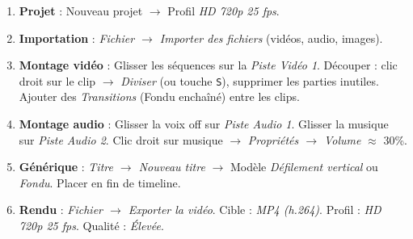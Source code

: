 \documentclass[11pt]{article}
\begin{document}
\begin{methode}
\begin{enumerate}
  \item \textbf{Projet} : Nouveau projet $\rightarrow$ Profil \emph{HD 720p 25 fps}.
  \item \textbf{Importation} : \emph{Fichier $\rightarrow$ Importer des fichiers} (vidéos, audio, images).
  \item \textbf{Montage vidéo} : Glisser les séquences sur la \emph{Piste Vidéo 1}. Découper : clic droit sur le clip $\rightarrow$ \emph{Diviser} (ou touche \texttt{S}), supprimer les parties inutiles. Ajouter des \emph{Transitions} (Fondu enchaîné) entre les clips.
  \item \textbf{Montage audio} : Glisser la voix off sur \emph{Piste Audio 1}. Glisser la musique sur \emph{Piste Audio 2}. Clic droit sur musique $\rightarrow$ \emph{Propriétés $\rightarrow$ Volume} $\approx$ 30\%.
  \item \textbf{Générique} : \emph{Titre $\rightarrow$ Nouveau titre} $\rightarrow$ Modèle \emph{Défilement vertical} ou \emph{Fondu}. Placer en fin de timeline.
  \item \textbf{Rendu} : \emph{Fichier $\rightarrow$ Exporter la vidéo}. Cible : \emph{MP4 (h.264)}. Profil : \emph{HD 720p 25 fps}. Qualité : \emph{Élevée}.
\end{enumerate}
\end{methode}
\end{document}
